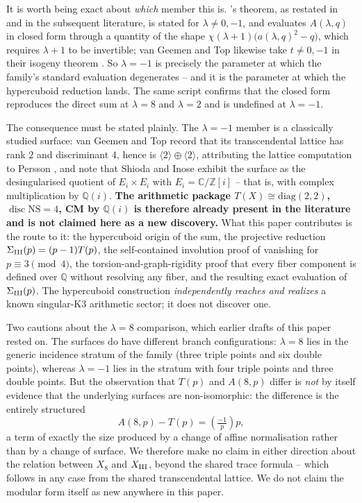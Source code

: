 \documentclass[11pt]{amsart}
\theoremstyle{definition}
\newcommand{\Q}{\mathbb{Q}}
\newcommand{\Z}{\mathbb{Z}}
\newcommand{\NS}{\mathrm{NS}}
\DeclareMathOperator{\disc}{disc}
\begin{document}
It is worth being exact about \emph{which} member this is.
\cite{AOP2002}'s theorem, as restated in \cite{AmirHong2021} and in the
subsequent literature, is stated for $\lambda\neq0,-1$, and evaluates
$A(\lambda,q)$ in closed form through a quantity of the shape
$\chi(\lambda+1)\bigl(a(\lambda,q)^2-q\bigr)$, which requires $\lambda+1$
to be invertible; van Geemen and Top likewise take
$t\neq0,-1$ in their isogeny theorem \cite{vanGeemenTop2006}. So
$\lambda=-1$ is precisely the parameter at which the family's standard
evaluation degenerates -- and it is the parameter at which the
hypercuboid reduction lands. The same script confirms that the closed
form reproduces the direct sum at $\lambda=8$ and $\lambda=2$ and is
undefined at $\lambda=-1$.

The consequence must be stated plainly. The $\lambda=-1$ member is a
classically studied surface: van Geemen and Top \cite{vanGeemenTop2006}
record that its transcendental lattice has rank $2$ and discriminant $4$,
hence is $\langle2\rangle\oplus\langle2\rangle$, attributing the lattice
computation to Persson \cite{Persson1985}, and note that Shioda and Inose
\cite{ShiodaInose1977} exhibit the surface as the desingularised quotient
of $E_i\times E_i$ with $E_i=\mathbb{C}/\Z[i]$ -- that is, with complex
multiplication by $\Q(i)$. \textbf{The arithmetic package
$T(X)\cong\mathrm{diag}(2,2)$, $\disc\NS=4$, CM by $\Q(i)$ is therefore
already present in the literature and is not claimed here as a new
discovery.} What this paper contributes is the route to it: the
hypercuboid origin of the sum, the projective reduction
$\Sigma_{\rm III}(p)=(p-1)T(p)$, the self-contained involution proof of
vanishing for $p\equiv3\pmod4$, the torsion-and-graph-rigidity proof that
every fiber component is defined over $\Q$ without resolving any fiber,
and the resulting exact evaluation of $\Sigma_{\rm III}(p)$. The
hypercuboid construction \emph{independently reaches and realizes} a known
singular-K3 arithmetic sector; it does not discover one.

Two cautions about the $\lambda=8$ comparison, which earlier drafts of
this paper rested on. The surfaces do have different branch
configurations: $\lambda=8$ lies in the generic incidence stratum of the
family (three triple points and six double points), whereas $\lambda=-1$
lies in the stratum with four triple points and three double points. But
the observation that $T(p)$ and $A(8,p)$ differ is \emph{not} by itself
evidence that the underlying surfaces are non-isomorphic: the difference
is the entirely structured
\[
  A(8,p)-T(p)=\left(\tfrac{-1}{p}\right)p ,
\]
a term of exactly the size produced by a change of affine normalisation
rather than by a change of surface. We therefore make no claim in either
direction about the relation between $X_8$ and $X_{\rm III}$, beyond the
shared trace formula -- which follows in any case from the shared
transcendental lattice. We do not claim the modular form itself as new
anywhere in this paper.
\end{document}
